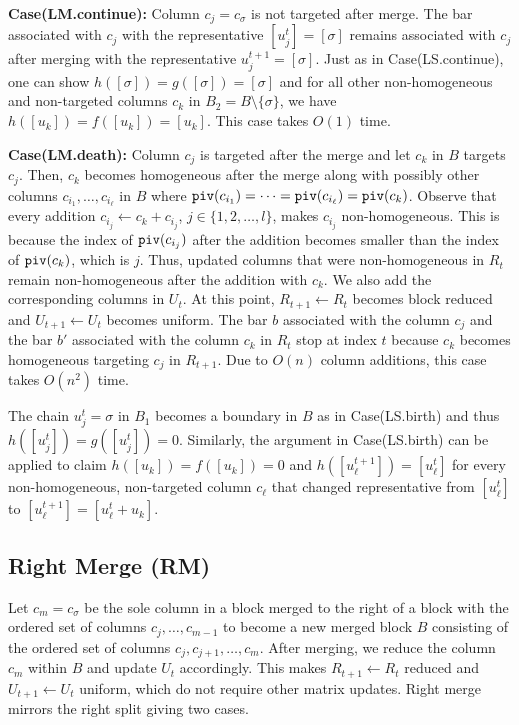 \documentclass[letterpaper,11pt]{article}
\theoremstyle{plain}
\theoremstyle{definition}
\newcounter{li}
\newcommand{\low}{{\tt piv}}
\begin{document}
\textbf{Case(LM.continue):} Column $c_j=c_\sigma$ is not targeted  
after merge. The bar associated with $c_j$ with the representative $[u_j^t]=[\sigma]$ remains associated with $c_j$ after merging with the 
representative $u^{t+1}_j=[\sigma]$. Just as in Case(LS.continue), 
one can show $h([\sigma])=g([\sigma])=[\sigma]$ and for all other non-homogeneous and
non-targeted columns $c_k$ in $B_2=B\setminus \{\sigma\}$, we have $h([u_k])=f([u_k])=[u_k]$. This case takes $O(1)$ time.

\textbf{Case(LM.death):} Column $c_j$ is
    targeted after the merge and let $c_k$ in $B$ targets $c_j$.
Then, $c_k$ becomes homogeneous after the merge along with possibly
other columns $c_{i_1},\ldots, c_{i_\ell}$ in $B$ where $\low(c_{i_1})=\cdots=\low(c_{i_\ell})=\low(c_k)$.
Observe that every addition $c_{i_j}\leftarrow c_k+c_{i_j}$, $j\in \{1,2,\ldots,l\}$, makes $c_{i_j}$ non-homogeneous. This is because the index of $\low(c_{i_j})$ after the addition becomes smaller than the index of $\low(c_k)$, which is $j$.
Thus, updated columns that were non-homogeneous in $R_t$ remain non-homogeneous
after the addition with $c_k$. We also add the corresponding columns 
in $U_t$. At this point, $R_{t+1}\leftarrow R_t$ becomes
block reduced and $U_{t+1}\leftarrow U_t$ becomes uniform. 
The bar $b$ associated with the column $c_j$ and the bar $b'$ associated
with the column $c_k$ in $R_t$ stop at index $t$ because $c_k$ becomes homogeneous targeting $c_j$ in $R_{t+1}$. Due to $O(n)$ column additions, this case
takes $O(n^2)$ time.

The chain $u_j^t=\sigma$ in $B_1$ becomes a boundary in $B$  
as in Case(LS.birth) and thus $h([u_j^t])=g([u_j^t])=0$. Similarly,
the argument in Case(LS.birth) can be applied to claim
$h([u_k])=f([u_k])=0$ and 
$h([u^{t+1}_\ell])=[u^t_\ell]$ for
every non-homogeneous, non-targeted column $c_\ell$ that changed
representative from $[u^t_\ell]$ to $[u^{t+1}_\ell]=[u^t_\ell+u_k]$.

\subsection{Right Merge (RM)}
Let $c_m=c_\sigma$ be the sole column in a block merged to the right of a block with the ordered set of columns $c_j,\ldots, c_{m-1}$ to become a new merged block $B$ consisting of the ordered set of columns $c_j,c_{j+1},\ldots, c_m$. After merging, we reduce the column $c_m$ within $B$ and update $U_{t}$ accordingly. 
This makes $R_{t+1}\leftarrow R_t$ reduced and $U_{t+1}\leftarrow U_t$ uniform, which do not require other matrix updates.
Right merge mirrors the right split giving two cases.
\end{document}
